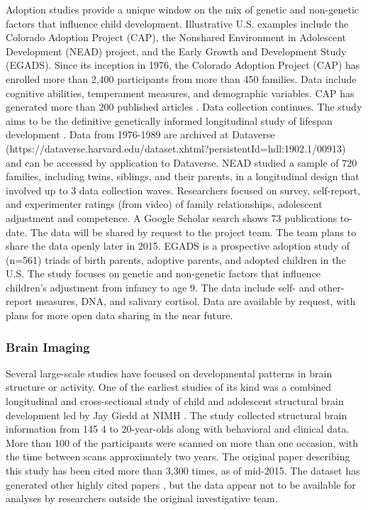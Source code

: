 \documentclass[letterpaper,man,apacite]{apa6}
\begin{document}
Adoption studies provide a unique window on the mix of genetic and non-genetic factors that influence child development.
Illustrative U.S. examples include the Colorado Adoption Project (CAP), the Nonshared Environment in Adolescent Development (NEAD) project, and the Early Growth and Development Study (EGADS).
Since its inception in 1976, the Colorado Adoption Project (CAP) \cite{CAP} has enrolled more than 2,400 participants from more than 450 families.
Data include cognitive abilities, temperament measures, and demographic variables.
CAP has generated more than 200 published articles \cite{CAP_pubs}.
Data collection continues.
The study aims to be the definitive genetically informed longitudinal study of lifespan development \cite{rhea_colorado_2013}.
Data from 1976-1989 are archived at Dataverse (https://dataverse.harvard.edu/dataset.xhtml?persistentId=hdl:1902.1/00913) and can be accessed by application to Dataverse.
NEAD studied a sample of 720 families, including twins, siblings, and their parents, in a longitudinal design that involved up to 3 data collection waves.
Researchers focused on survey, self-report, and experimenter ratings (from video) of family relationships, adolescent adjustment and competence.
A Google Scholar search shows 73 publications to-date.
The data will be shared by request to the project team.
The team plans to share the data openly later in 2015.
EGADS is a prospective adoption study of (n=561) triads of birth parents, adoptive parents, and adopted children in the U.S. 
The study focuses on genetic and non-genetic factors that influence children’s adjustment from infancy to age 9. 
The data include self- and other-report measures, DNA, and salivary cortisol.
Data are available by request, with plans for more open data sharing in the near future.

\subsubsection{Brain Imaging}

Several large-scale studies have focused on developmental patterns in brain structure or activity.
One of the earliest studies of its kind was a combined longitudinal and cross-sectional study of child and adolescent structural brain development led by Jay Giedd at NIMH \cite{giedd_brain_1999}.
The study collected structural brain information from 145 4 to 20-year-olds along with behavioral and clinical data.
More than 100 of the participants were scanned on more than one occasion, with the time between scans approximately two years.
The original paper describing this study has been cited more than 3,300 times, as of mid-2015.
The dataset has generated other highly cited papers \cite{gogtay_dynamic_2004}, but the data appear not to be available for analyses by researchers outside the original investigative team.
\end{document}
